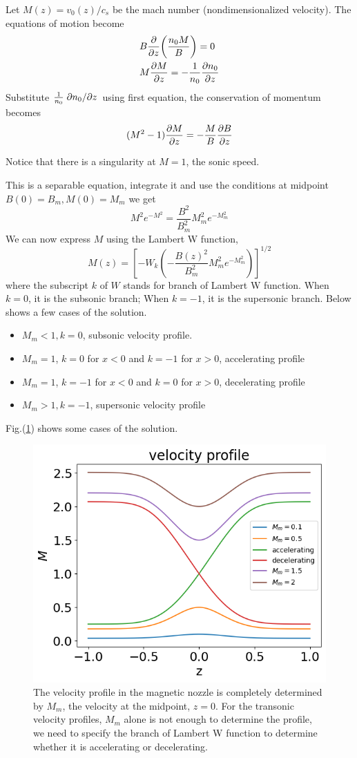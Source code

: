 Let $M(z) = v_0(z)/c_s$ be the mach number (nondimensionalized velocity). The equations of motion become
\begin{align*}
	&B\pdv{z}(\frac{n_0M}{B}) = 0\\
	&M\pdv{M}{z} = -\frac{1}{n_0}\pdv{n_0}{z}
\end{align*}
Substitute $\frac{1}{n_0}\pdv*{n_0}{z}$ using first equation, the conservation of momentum becomes
\[ (M^2-1)\pdv{M}{z} = -\frac{M}{B}\pdv{B}{z} \]

Notice that there is a singularity at $M=1$, the sonic speed.

This is a separable equation, integrate it and use the conditions at midpoint $B(0)=B_m, M(0)=M_m$ we get
\[ M^2e^{-M^2} = \frac{B^2}{B_m^2}M_m^2e^{-M_m^2} \]
We can now express $M$ using the Lambert W function,
\[ M(z) = \left[ -W_k\left(-\frac{B(z)^2}{B_m^2}M_m^2e^{-M_m^2}\right) \right]^{1/2} \]
where the subscript $k$ of $W$ stands for branch of Lambert W function. When $k=0$, it is the subsonic branch; When $k=-1$, it is the supersonic branch. Below shows a few cases of the solution.
\begin{itemize}
	\item $M_m < 1, k=0$, subsonic velocity profile.
	\item $M_m = 1$, $k=0$ for $x<0$ and $k=-1$ for $x>0$, accelerating profile
	\item $M_m = 1$, $k=-1$ for $x<0$ and $k=0$ for $x>0$, decelerating profile
	\item $M_m > 1, k=-1$, supersonic velocity profile
\end{itemize}
 Fig.(\ref{fig:velocity-profiles}) shows some cases of the solution.
\begin{figure}[H]
	\centering
	\includegraphics[width=0.7\linewidth]{img/introduction/velocity-profiles}
	\caption{The velocity profile in the magnetic nozzle is completely determined by $M_m$, the velocity at the midpoint, $z=0$. For the transonic velocity profiles, $M_m$ alone is not enough to determine the profile, we need to specify the branch of Lambert W function to determine whether it is accelerating or decelerating.}
	\label{fig:velocity-profiles}
\end{figure}

